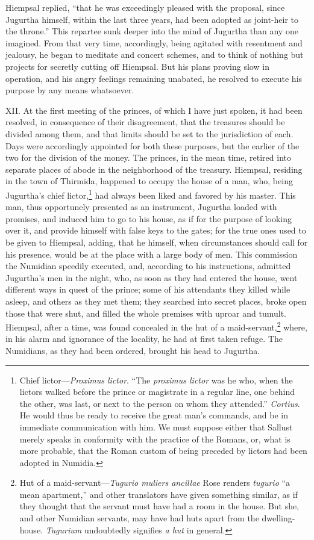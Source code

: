Hiempsal replied, ``that he was exceedingly pleased with the proposal,
since Jugurtha himself, within the last three years, had been adopted
as joint-heir to the throne.'' This repartee sunk deeper into the mind
of Jugurtha than any one imagined. From that very time, accordingly,
being agitated with resentment and jealousy, he began to meditate and
concert schemes, and to think of nothing but projects for secretly
cutting off Hiempsal. But his plans proving slow in operation, and his
angry feelings remaining unabated, he resolved to execute his purpose
by any means whatsoever.

XII. At the first meeting of the princes, of which I have just spoken,
it had been resolved, in consequence of their disagreement, that the
treasures should be divided among them, and that limits should be set
to the jurisdiction of each. Days were accordingly appointed for both
these purposes, but the earlier of the two for the division of the
money. The princes, in the mean time, retired into separate places of
abode in the neighborhood of the treasury. Hiempsal, residing in the
town of Thirmida, happened to occupy the house of a man, who, being
Jugurtha's chief lictor,\footnote{Chief lictor—\emph{Proximus lictor}. ``The \emph{proximus lictor} was
he who, when the lictors walked before the prince or magistrate in a
regular line, one behind the other, was last, or next to the person on
whom they attended.'' \emph{Cortius}. He would thus be ready to receive the
great man's commands, and be in immediate communication with him. We
must suppose either that Sallust merely speaks in conformity with the
practice of the Romans, or, what is more probable, that the Roman
custom of being preceded by lictors had been adopted in Numidia.} had always been liked and favored by his
master. This man, thus opportunely presented as an instrument,
Jugurtha loaded with promises, and induced him to go to his house, as
if for the purpose of looking over it, and provide himself with false
keys to the gates; for the true ones used to be given to Hiempsal,
adding, that he himself, when circumstances should call for his
presence, would be at the place with a large body of men. This
commission the Numidian speedily executed, and, according to his
instructions, admitted Jugurtha's men in the night, who, as soon as
they had entered the house, went different ways in quest of the
prince; some of his attendants they killed while asleep, and others as
they met them; they searched into secret places, broke open those that
were shut, and filled the whole premises with uproar and tumult.
Hiempsal, after a time, was found concealed in the hut of a
maid-servant,\footnote{Hut of a maid-servant—\emph{Tugurio muliers ancillae} Rose renders
\emph{tugurio} ``a mean apartment,'' and other translators have given
something similar, as if they thought that the servant must have had a
room in the house. But she, and other Numidian servants, may have had
huts apart from the dwelling-house. \emph{Tugurium} undoubtedly signifies
\emph{a hut} in general.} where, in his alarm and ignorance of the locality,
he had at first taken refuge. The Numidians, as they had been ordered,
brought his head to Jugurtha.

